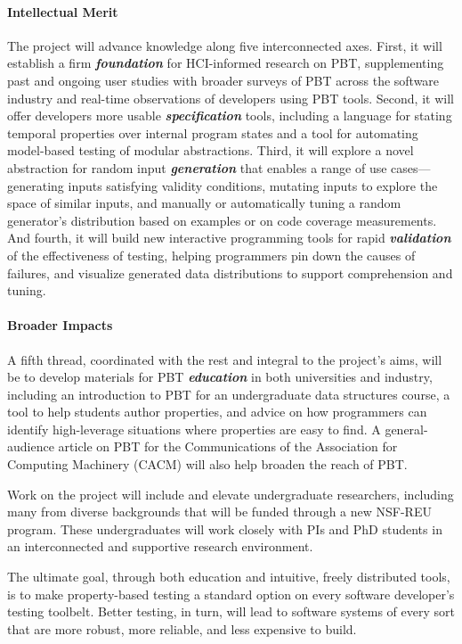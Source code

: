 \paragraph*{Intellectual Merit}
The project will advance knowledge along five interconnected axes.
%
First, it will establish a firm {\bf\em foundation} for HCI-informed
research on PBT, supplementing past and ongoing user studies with
broader surveys of PBT across the software industry and real-time
observations of developers using PBT tools.
%
Second, it will offer developers more usable {\bf\em specification} tools,
including a language for stating temporal properties over internal
program states and a tool for automating model-based testing of
modular abstractions.
%
Third, it will explore a novel abstraction for random input {\bf\em
  generation} that enables a range of use cases---generating inputs
satisfying validity conditions, mutating inputs to explore the space
of similar inputs, and manually or automatically tuning a random
generator's distribution based on examples or on code coverage
measurements.
%
And fourth, it will build new interactive programming tools for rapid
{\bf\em validation} of the effectiveness of testing, helping programmers
pin down the causes of failures, and visualize generated data
distributions to support comprehension and tuning.


\paragraph*{Broader Impacts}
A fifth thread, coordinated with the rest and integral to the
project's aims, will be to develop materials for PBT {\bf\em education}
in both universities and industry, including an introduction to PBT for
an undergraduate data structures course, a tool to help students
author properties, and advice on how programmers can identify
high-leverage situations where properties are easy to find.
%
A general-audience article on PBT for the Communications of the
Association for Computing Machinery (CACM) will also help broaden the
reach of PBT.

Work on the project will include and elevate undergraduate
researchers, including many from diverse backgrounds that will be
funded through a new NSF-REU program. These undergraduates will work
closely with PIs and PhD students in an interconnected and supportive
research environment.

The ultimate goal, through both education and intuitive, freely
distributed tools, is to make property-based testing a standard option
on every software developer's testing toolbelt.  Better testing, in
turn, will lead to software systems of every sort that are more
robust, more reliable, and less expensive to build.



